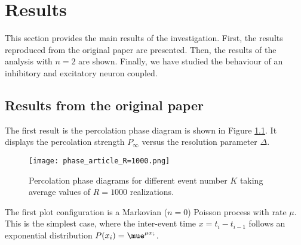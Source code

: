 \chapter{Results}

This section provides the main results of the investigation. First, the results reproduced from the original paper \cite{notarmuzi2021percolation} are presented. Then, the results of
the analysis with $n=2$ are shown. Finally, we have studied the behaviour of an inhibitory and excitatory neuron coupled.

\section{Results from the original paper}

The first result is the percolation phase diagram is shown in Figure \ref{f:phase_diagram_article}. It displays the percolation strength $P_{\infty}$ versus the resolution parameter $\Delta$.

\begin{figure}[H]
    \centering
    \texttt{[image: phase\_article\_R=1000.png]}
    \caption{Percolation phase diagrams for different event number $K$ taking average values of $R=1000$ realizations.}
    \label{f:phase_diagram_article}
\end{figure}

The first plot configuration is a Markovian ($n=0$) Poisson process with rate $\mu$. This is the simplest case, where the inter-event time $x=t_i-t_{i-1}$ follows an exponential 
distribution $P(x_i)=\mue^{\mu x_i}$.